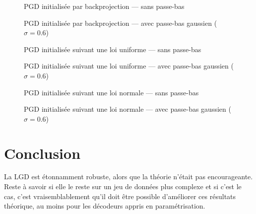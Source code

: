 \documentclass[hidelinks, french]{article} %
\theoremstyle{enonce}
\theoremstyle{special}
\theoremstyle{rq}
\theoremstyle{exo}
\theoremstyle{demo}
\begin{document}
\begin{figure}[H]\centering
	
	\caption{PGD initialisée par backprojection --- sans passe-bas}
	\label{fig:PGDbackproj-s}
\end{figure}

\begin{figure}[H]\centering
	
	\caption{PGD initialisée par backprojection --- avec passe-bas gaussien ($\sigma=0.6$)}
	\label{fig:PGDbackproj-g}
\end{figure}

\begin{figure}[H]\centering
	
	\caption{PGD initialisée suivant une loi uniforme --- sans passe-bas}
	\label{fig:PGDunif-s}
\end{figure}

\begin{figure}[H]\centering
	
	\caption{PGD initialisée suivant une loi uniforme --- avec passe-bas gaussien ($\sigma=0.6$)}
	\label{fig:PGDunif-g}
\end{figure}

\begin{figure}[H]\centering
	
	\caption{PGD initialisée suivant une loi normale --- sans passe-bas}
	\label{fig:PGDgauss-s}
\end{figure}

\begin{figure}[H]\centering
	
	\caption{PGD initialisée suivant une loi normale --- avec passe-bas gaussien ($\sigma=0.6$)}
	\label{fig:PGDgauss-g}
\end{figure}





\newpage



\section{Conclusion}
\quad

La LGD est étonnamment robuste, alors que la théorie n'était pas encourageante.  Reste à savoir si elle le reste sur un jeu de données plus complexe et si c'est le cas, c'est vraisemblablement qu'il doit être possible d'améliorer ces résultats théorique, au moins pour les décodeurs appris en paramétrisation. 
\\
\end{document}
